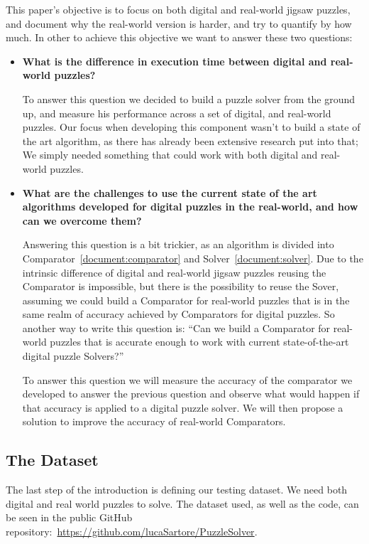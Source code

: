\documentclass{article}
\begin{document}
This paper’s objective is to focus on both digital and real-world jigsaw puzzles,
and document why the real-world version is harder, and try to quantify by how much.
In other to achieve this objective we want to answer these two questions:
\begin{itemize}
  \item \textbf{What is the difference in execution time between
                digital and real-world puzzles?}
  
  To answer this question we decided to build a puzzle solver from the ground up,
  and measure his performance across a set of digital, and real-world puzzles.
  Our focus when developing this component wasn't to build a state of the art algorithm,
  as there has already been extensive research put into that;
  We simply needed something that could work with both digital and real-world puzzles.
  
  \item \textbf{What are the challenges to use the current state of the art algorithms developed for digital
                puzzles in the real-world, and how can we overcome them?}
  
	Answering this question is a bit trickier, as an algorithm is divided into Comparator~\cref{document:comparator}
  and Solver~\cref{document:solver}. Due to the intrinsic difference of digital and real-world jigsaw puzzles
  reusing the Comparator is impossible, but there is the possibility to reuse the Sover,
  assuming we could build a Comparator for real-world puzzles that is in the same realm
  of accuracy achieved by Comparators for digital puzzles.
  So another way to write this question is: ``Can we build a Comparator for real-world
  puzzles that is accurate enough to work with current state-of-the-art  digital
  puzzle Solvers?''

	To answer this question we will measure the accuracy of the comparator we developed
  to answer the previous question and observe what would happen if that accuracy is
  applied to a digital puzzle solver. We will then propose a solution to improve
  the accuracy of real-world Comparators.


\end{itemize}


\subsection{The Dataset}
The last step of the introduction is defining our
testing dataset. We need both digital and real world
puzzles to solve. The dataset used, as well as
the code, can be seen in the public GitHub
repository:~\url{https://github.com/lucaSartore/PuzzleSolver}.
\end{document}
